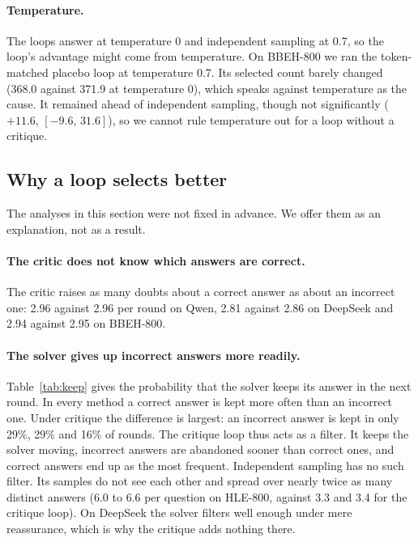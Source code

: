 \documentclass[11pt]{article}
\newcommand{\ds}{DeepSeek}
\newcommand{\qw}{Qwen}
\newcommand{\ci}[2]{$[#1,\,#2]$}
\begin{document}
\paragraph{Temperature.}
The loops answer at temperature 0 and independent sampling at 0.7, so the loop's advantage might come from temperature.
On BBEH-800 we ran the token-matched placebo loop at temperature 0.7.
Its selected count barely changed (368.0 against 371.9 at temperature 0), which speaks against temperature as the cause.
It remained ahead of independent sampling, though not significantly ($+11.6$, \ci{-9.6}{31.6}), so we cannot rule temperature out for a loop without a critique.

\subsection{Why a loop selects better}
\label{sec:mech}

The analyses in this section were not fixed in advance. We offer them as an explanation, not as a result.

\paragraph{The critic does not know which answers are correct.}
The critic raises as many doubts about a correct answer as about an incorrect one: 2.96 against 2.96 per round on \qw, 2.81 against 2.86 on \ds{} and 2.94 against 2.95 on BBEH-800.

\paragraph{The solver gives up incorrect answers more readily.}
Table~\ref{tab:keep} gives the probability that the solver keeps its answer in the next round.
In every method a correct answer is kept more often than an incorrect one.
Under critique the difference is largest: an incorrect answer is kept in only 29\%, 29\% and 16\% of rounds.
The critique loop thus acts as a filter. It keeps the solver moving, incorrect answers are abandoned sooner than correct ones, and correct answers end up as the most frequent.
Independent sampling has no such filter. Its samples do not see each other and spread over nearly twice as many distinct answers (6.0 to 6.6 per question on HLE-800, against 3.3 and 3.4 for the critique loop).
On \ds{} the solver filters well enough under mere reassurance, which is why the critique adds nothing there.
\end{document}
